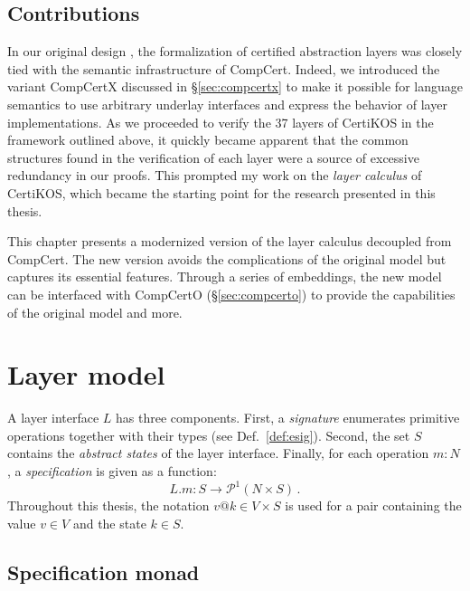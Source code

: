 \documentclass[draft,11pt]{report}
\theoremstyle{definition}
\begin{document}

\subsection{Contributions} %

In our original design \citep{popl15},
the formalization of certified abstraction layers
was closely tied with
the semantic infrastructure of CompCert.
Indeed,
we introduced the variant CompCertX discussed in \S\ref{sec:compcertx}
to make it possible for language semantics
to use arbitrary underlay interfaces and
express the behavior of layer implementations.
As we proceeded to verify the 37 layers of CertiKOS
in the framework outlined above,
it quickly became apparent that
the common structures found in the verification of each layer
were a source of excessive redundancy in our proofs.
This prompted my work on the \emph{layer calculus} of CertiKOS,
which became the starting point for the research
presented in this thesis.

This chapter
presents a modernized version of the layer calculus
decoupled from CompCert.
The new version avoids the complications of the original model
but captures its essential features.
Through a series of embeddings,
the new model can be interfaced with
CompCertO (\S\ref{sec:compcerto})
to provide the capabilities of the original model
and more.



\section{Layer model} %

A layer interface $L$ has three components.
First, a \emph{signature} enumerates
primitive operations together with their types
(see Def.~\ref{def:esig}).
Second,
the set $S$ contains the \emph{abstract states} of the layer interface.
Finally, for each operation $m : N$,
a \emph{specification}
is given as a function:
\[
  L.m : S \rightarrow \mathcal{P}^1( N \times S) \,.
\]
Throughout this thesis,
the notation $v@k \in V \times S$ is used for a pair
containing the value $v \in V$ and the state $k \in S$.

\subsection{Specification monad} %
\end{document}
